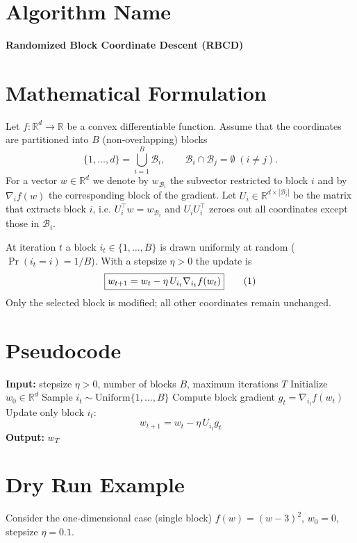 \documentclass{article}
\newcommand{\R}{\mathbb{R}}
\newcommand{\block}[1]{U_{#1}}
\begin{document}
\section*{Algorithm Name}
\textbf{Randomized Block Coordinate Descent (RBCD)}

\section*{Mathematical Formulation}
Let $f:\R^{d}\rightarrow\R$ be a convex differentiable function.  
Assume that the coordinates are partitioned into $B$ (non‑overlapping) blocks
\[
\{1,\dots ,d\}= \bigcup_{i=1}^{B}\mathcal{B}_{i},\qquad
\mathcal{B}_{i}\cap \mathcal{B}_{j}=\emptyset\;(i\neq j).
\]
For a vector $w\in\R^{d}$ we denote by $w_{\mathcal{B}_{i}}$ the subvector restricted to block $i$ and by
$\nabla_{i}f(w)$ the corresponding block of the gradient.
Let $\block{i}\in\R^{d\times |\mathcal{B}_{i}|}$ be the matrix that extracts block $i$,
i.e. $\block{i}^{\top}w = w_{\mathcal{B}_{i}}$ and $\block{i}\block{i}^{\top}$ zeroes out all coordinates except those in $\mathcal{B}_{i}$.

At iteration $t$ a block $i_{t}\in\{1,\dots ,B\}$ is drawn uniformly at random
($\Pr(i_{t}=i)=1/B$).  With a stepsize $\eta>0$ the update is
\[
\boxed{%
w_{t+1}= w_{t}-\eta\,\block{i_{t}}\nabla_{i_{t}} f(w_{t}) } \tag{1}
\]
Only the selected block is modified; all other coordinates remain unchanged.

\section*{Pseudocode}
\begin{algorithm}[H]
\caption{Randomized Block Coordinate Descent}
\begin{algorithmic}[1]
\State \textbf{Input:} stepsize $\eta>0$, number of blocks $B$, maximum iterations $T$
\State Initialize $w_{0}\in\R^{d}$
    \State Sample $i_{t}\sim\text{Uniform}\{1,\dots ,B\}$
    \State Compute block gradient $g_{t}= \nabla_{i_{t}} f(w_{t})$
    \State Update only block $i_{t}$:
    \[
        w_{t+1}= w_{t}-\eta\,\block{i_{t}} g_{t}
    \]
\EndFor
\State \textbf{Output:} $w_{T}$
\end{algorithmic}
\end{algorithm}

\section*{Dry Run Example}
Consider the one‑dimensional case (single block) $f(w)=(w-3)^{2}$, $w_{0}=0$, stepsize $\eta=0.1$.
\end{document}
